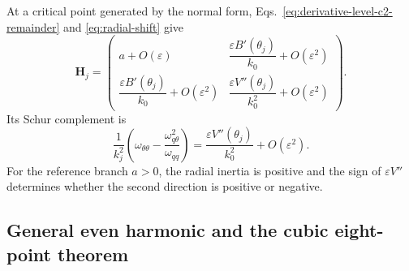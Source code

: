 At a critical point generated by the normal form,
Eqs.~\eqref{eq:derivative-level-c2-remainder} and
\eqref{eq:radial-shift} give
\begin{equation}
  \mathbf H_j
  =
  \begin{pmatrix}
    a+O(\varepsilon)
      &\dfrac{\varepsilon B'(\theta_j)}{k_0}+O(\varepsilon^2)\\[8pt]
    \dfrac{\varepsilon B'(\theta_j)}{k_0}+O(\varepsilon^2)
      &\dfrac{\varepsilon V''(\theta_j)}{k_0^2}
       +O(\varepsilon^2)
  \end{pmatrix}.
  \label{eq:leading-anisotropic-cartesian-hessian}
\end{equation}
Its Schur complement is
\begin{equation}
  \frac{1}{k_j^2}\left(
    \omega_{\theta\theta}
    -\frac{\omega_{q\theta}^2}{\omega_{qq}}
  \right)
  =\frac{\varepsilon V''(\theta_j)}{k_0^2}
   +O(\varepsilon^2).
  \label{eq:leading-tangential-schur-complement}
\end{equation}
For the reference branch \(a>0\), the radial inertia is positive and the
sign of \(\varepsilon V''\) determines whether the second direction is
positive or negative.

\subsection{General even harmonic and the cubic eight-point theorem}

